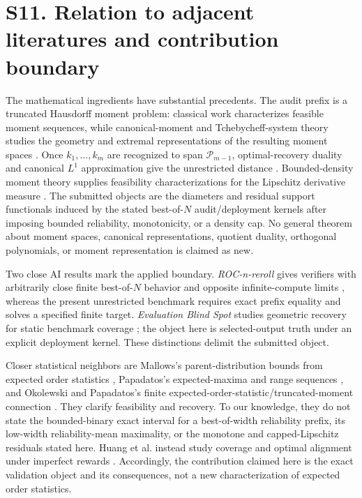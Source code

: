 \section*{S11. Relation to adjacent literatures and contribution boundary}

The mathematical ingredients have substantial precedents. The audit prefix is
a truncated Hausdorff moment problem: classical work characterizes feasible
moment sequences, while canonical-moment and Tchebycheff-system theory studies
the geometry and extremal representations of the resulting moment spaces
\citep{hausdorff1921,dette1997}. Once $k_1,\ldots,k_m$ are recognized to span
$\mathcal P_{m-1}$, optimal-recovery duality and canonical $L^1$
approximation give the unrestricted distance \citep{donoho1994,bojanov1986}.
Bounded-density moment theory supplies feasibility characterizations for the
Lipschitz derivative measure \citep{lasserre2006}. The submitted objects are
the diameters and residual support functionals induced by the stated
best-of-$N$ audit/deployment kernels after imposing bounded reliability,
monotonicity, or a density cap. No general theorem about moment spaces,
canonical representations, quotient duality, orthogonal polynomials, or
moment representation is claimed as new.

Two close AI results mark the applied boundary. \emph{ROC-n-reroll} gives
verifiers with arbitrarily close finite best-of-$N$ behavior and opposite
infinite-compute limits \citep{dorner2026}, whereas the present unrestricted
benchmark requires exact prefix equality and solves a specified finite target.
\emph{Evaluation Blind Spot} studies geometric recovery for static benchmark
coverage \citep{wang2026}; the object here is selected-output truth under an
explicit deployment kernel. These distinctions delimit the submitted object.

Closer statistical neighbors are Mallows's parent-distribution bounds from
expected order statistics \citep{mallows1973}, Papadatos's expected-maxima and
range sequences \citep{papadatos2017}, and Okolewski and Papadatos's finite
expected-order-statistic/truncated-moment connection \citep{okolewski2024}.
They clarify feasibility and recovery. To our knowledge, they do not state the
bounded-binary exact interval for a best-of-width reliability prefix, its
low-width reliability-mean maximality, or the monotone and capped-Lipschitz
residuals stated here. Huang et al. instead study coverage and optimal alignment
under imperfect rewards \citep{huang2025}. Accordingly, the contribution claimed
here is the exact validation object and its consequences, not a new
characterization of expected order statistics.

